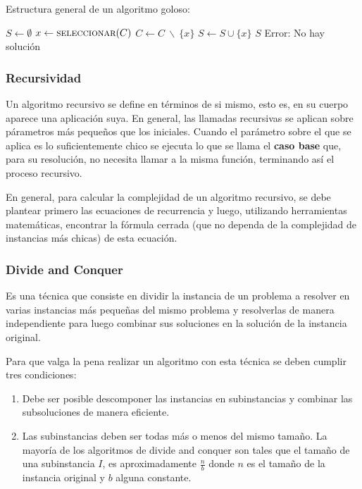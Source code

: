 Estructura general de un algoritmo goloso:

\begin{algorithmic}
	\State \(S\gets\emptyset\)
		\State \(x \gets \Call{seleccionar}{C}\)
		\State \(C \gets C~\backslash~\{x\}\)
			\State \(S\gets S\cup\{x\}\)
		\EndIf
	\EndWhile
		\Return \(S\)
	\Else
		\State\Return Error: No hay solución
	\EndIf
	\EndFunction
\end{algorithmic}

\subsubsection{Recursividad}
Un algoritmo recursivo se define en términos de si mismo, esto es, en su cuerpo aparece una aplicación suya. En general, las llamadas recursivas se aplican sobre párametros más pequeños que los iniciales. Cuando el parámetro sobre el que se aplica es lo suficientemente chico se ejecuta lo que se llama el \textbf{caso base} que, para su resolución, no necesita llamar a la misma función, terminando así el proceso recursivo.

En general, para calcular la complejidad de un algoritmo recursivo, se debe plantear primero las ecuaciones de recurrencia y luego, utilizando herramientas matemáticas, encontrar la fórmula cerrada (que no dependa de la complejidad de instancias más chicas) de esta ecuación.

\subsubsection{Divide and Conquer}
Es una técnica que consiste en dividir la instancia de un problema a resolver en varias instancias más pequeñas del mismo problema y resolverlas de manera independiente para luego combinar sus soluciones en la solución de la instancia original. 

Para que valga la pena realizar un algoritmo con esta técnica se deben cumplir tres condiciones:

\begin{enumerate}
	\item Debe ser posible descomponer las instancias en subinstancias y combinar las subsoluciones de manera eficiente.
	\item Las subinstancias deben ser todas más o menos del mismo tamaño. La mayoría de los algoritmos de divide and conquer son tales que el tamaño de una subinstancia \(I\), es aproximadamente \(\frac{n}{b}\) donde \(n\) es el tamaño de la instancia original y \(b\) alguna constante.
\end{enumerate}

